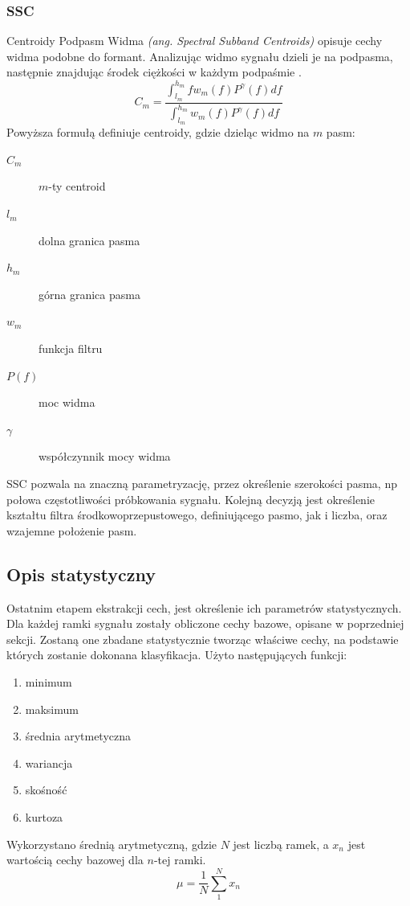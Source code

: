 \documentclass[a4paper,12pt,twoside,openany]{report}
\newcommand{\ang}[1]{\textit{(ang. #1)}}
\begin{document}
\subsubsection{SSC}
Centroidy Podpasm Widma \ang{Spectral Subband Centroids} opisuje cechy widma podobne do formant.
Analizując widmo sygnału dzieli je na podpasma, następnie znajdując środek ciężkości w każdym podpaśmie \cite{Majstorovic2011}.
\begin{equation}
	C_m=\frac
	{\int_{l_m}^{h_m} f w_m(f) P^\gamma(f)df}
	{\int_{l_m}^{h_m} w_m(f) P^\gamma(f)df}
	\label{eq:ssc}
\end{equation}
Powyższa formułą definiuje centroidy, gdzie dzieląc widmo na $m$ pasm:
\begin{description}
	\item[$C_m$] $m$-ty centroid
	\item[$l_m$] dolna granica pasma
	\item[$h_m$] górna granica pasma
	\item[$w_m$] funkcja filtru
	\item[$P(f)$] moc widma
	\item[$\gamma$] współczynnik mocy widma
\end{description}
SSC pozwala na znaczną parametryzację, przez określenie szerokości pasma, np połowa częstotliwości próbkowania sygnału.
Kolejną decyzją jest określenie kształtu filtra środkowoprzepustowego, definiującego pasmo, 
jak i liczba, oraz wzajemne położenie pasm.
\subsection{Opis statystyczny}
Ostatnim etapem ekstrakcji cech, jest określenie ich parametrów statystycznych.
Dla każdej ramki sygnału zostały obliczone cechy bazowe, opisane w poprzedniej sekcji.
Zostaną one zbadane statystycznie tworząc właściwe cechy, na podstawie których zostanie dokonana klasyfikacja.
Użyto następujących funkcji:
\begin{enumerate}
	\item minimum 
	\item maksimum 
	\item średnia arytmetyczna
	\item wariancja 
	\item skośność
	\item kurtoza
\end{enumerate}
Wykorzystano średnią arytmetyczną, gdzie $N$ jest liczbą ramek, a $x_n$ jest wartością cechy bazowej dla $n$-tej ramki.
\begin{equation}
	\mu = \frac{1}{N}\sum_1^Nx_n
\end{equation}
\end{document}
